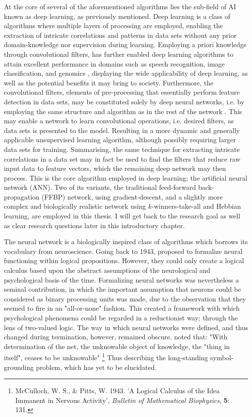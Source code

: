 At the core of several of the aforementioned algorithms lies the sub-field of AI known as deep learning, as previously mentioned. Deep learning is a class of algorithms where multiple layers of processing are employed, enabling the extraction of intricate correlations and patterns in data sets without any prior domain-knowledge nor supervision during learning. Employing a priori knowledge through convolutional filters, has further enabled deep learning algorithms to attain excellent performance in domains such as speech recognition, image classification, and genomics \citep{LeCun2015}, displaying the wide applicability of deep learning, as well as the potential benefits it may bring to society. Furthermore, the convolutional filters, elements of pre-processing that essentially perform feature detection in data sets, may be constituted solely by deep neural networks, i.e. by employing the same structure and algorithm as in the rest of the network \citep{LeCun2015}. This may enable a network to learn convolutional operations, i.e. desired filters, as data sets is presented to the model. Resulting in a more dynamic and generally applicable unsupervised learning algorithm, although possibly requiring larger data sets for training.
Summarising, the same technique for extracting intricate correlations in a data set may in fact be used to find the filters that reduce raw input data to feature vectors, which the remaining deep network may then process. This is the core algorithm employed in deep learning; the artificial neural network (ANN). Two of its variants, the traditional feed-forward back-propagation (FFBP) network, using gradient-descent, and a slightly more complex and biologically realistic network using $k$-winners-take-all and Hebbian learning, are employed in this thesis. I will get back to the research goal as well as clear research questions later in this introductory chapter.

The neural network is a biologically inspired class of algorithms which borrows its vocabulary from neuroscience. Going back to 1943, \cite{McCulloch1943} proposed to formalize neural functioning within logical propositions.
However, they could only create a logical calculus based upon the abstract assumptions of the neurological and psychological basis of the time. Formalizing neural networks was nevertheless a seminal contribution, in which the important assumption that neurons could be considered as binary processing units was made, due to the observation that they seemed to fire in an "all-or-none" fashion. This created a framework with which psychological phenomena could be regarded in a reductionist way; through the lens of two-valued logic. The way in which neural networks were defined, and thus changed during termination, however, remained obscure. \cite{McCulloch1943} noted that: "With determination of the net, the unknowable object of knowledge, the "thing in itself", ceases to be unknowable"
\footnote{McCulloch, W. S., \& Pitts, W. 1943. 'A Logical Calculus of the Idea Immanent in Nervous Activity', \textit{Bulletin of Mathematical Biophysics}, \textbf{5}: 131.}
Thus describing the long-standing symbol-grounding problem, which has yet to be elucidated.

